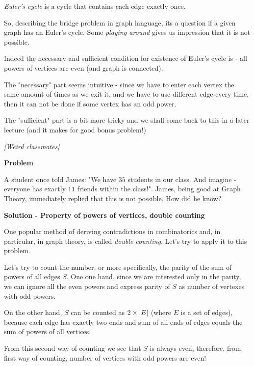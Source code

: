 \begin{problem}
\textit{Euler's cycle} is a cycle that contains each edge exactly once. 

So, describing the bridge problem in graph language, its a question if a given graph has an Euler's cycle. 
Some \textit{playing around} gives us impression that it is not possible. 

Indeed the necessary and sufficient condition for existence of Euler's cycle is - all powers of vertices are even (and graph is connected). 

The "necessary" part seems intuitive - since we have to enter each vertex the same amount of times as we exit it, and we have to use different edge every time, then it can not be done if some vertex has an odd power.

The "sufficient" part is a bit more tricky and we shall come back to this in a later lecture (and it makes for good bonus problem!) 
\end{problem}
%

\begin{problem}
\textit{[Weird classmates]}

\textbf{Problem}

A student once told James: "We have $35$ students in our class. And imagine - everyone has exactly $11$ friends within the class!". James, being good at Graph Theory, immediately replied that this is not possible. How did he know?

\textbf{Solution - Property of powers of vertices, double counting}

One popular method of deriving contradictions in combinatorics and, in particular, in graph theory, is called \textit{double counting}. Let's try to apply it to this problem.

Let's try to count the number, or more specifically, the parity of the sum of powers of all edges $S$. One one hand, since we are interested only in the parity, we can ignore all the even powers and express parity of $S$ as number of vertexes with odd powers. 

On the other hand, $S$ can be counted as $2 \times \lvert E\rvert$ (where $E$ is a set of edges), because each edge has exactly two ends and sum of all ends of edges equals the sum of powers of all vertices. 

From this second way of counting we see that $S$ is always even, therefore, from first way of counting, number of vertices with odd powers are even!
\end{problem}
%

